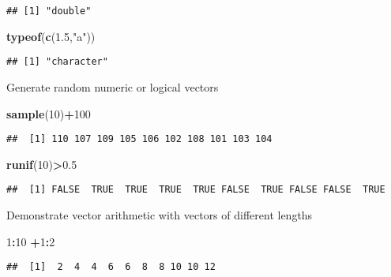 \documentclass[
]{article}
\newenvironment{Shaded}{\begin{snugshade}}{\end{snugshade}}
\newcommand{\DecValTok}[1]{\textcolor[rgb]{0.00,0.00,0.81}{#1}}
\newcommand{\FloatTok}[1]{\textcolor[rgb]{0.00,0.00,0.81}{#1}}
\newcommand{\FunctionTok}[1]{\textcolor[rgb]{0.13,0.29,0.53}{\textbf{#1}}}
\newcommand{\NormalTok}[1]{#1}
\newcommand{\SpecialCharTok}[1]{\textcolor[rgb]{0.81,0.36,0.00}{\textbf{#1}}}
\newcommand{\StringTok}[1]{\textcolor[rgb]{0.31,0.60,0.02}{#1}}
\begin{document}
\begin{verbatim}
## [1] "double"
\end{verbatim}

\begin{Shaded}
\begin{Highlighting}[]
\FunctionTok{typeof}\NormalTok{(}\FunctionTok{c}\NormalTok{(}\FloatTok{1.5}\NormalTok{,}\StringTok{"a"}\NormalTok{))}
\end{Highlighting}
\end{Shaded}

\begin{verbatim}
## [1] "character"
\end{verbatim}

Generate random numeric or logical vectors

\begin{Shaded}
\begin{Highlighting}[]
\FunctionTok{sample}\NormalTok{(}\DecValTok{10}\NormalTok{)}\SpecialCharTok{+}\DecValTok{100}
\end{Highlighting}
\end{Shaded}

\begin{verbatim}
##  [1] 110 107 109 105 106 102 108 101 103 104
\end{verbatim}

\begin{Shaded}
\begin{Highlighting}[]
\FunctionTok{runif}\NormalTok{(}\DecValTok{10}\NormalTok{)}\SpecialCharTok{\textgreater{}}\FloatTok{0.5}
\end{Highlighting}
\end{Shaded}

\begin{verbatim}
##  [1] FALSE  TRUE  TRUE  TRUE  TRUE FALSE  TRUE FALSE FALSE  TRUE
\end{verbatim}

Demonstrate vector arithmetic with vectors of different lengths

\begin{Shaded}
\begin{Highlighting}[]
\DecValTok{1}\SpecialCharTok{:}\DecValTok{10} \SpecialCharTok{+}\DecValTok{1}\SpecialCharTok{:}\DecValTok{2}
\end{Highlighting}
\end{Shaded}

\begin{verbatim}
##  [1]  2  4  4  6  6  8  8 10 10 12
\end{verbatim}
\end{document}
